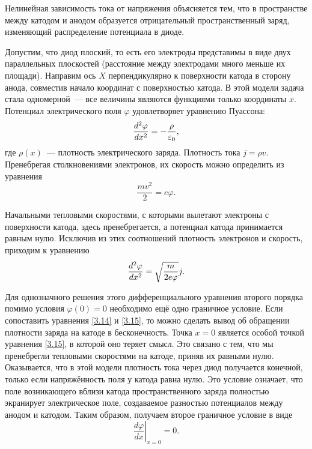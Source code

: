 Нелинейная зависимость тока от напряжения объясняется тем, что в пространстве между катодом и анодом образуется
отрицательный пространственный заряд, изменяющий распределение потенциала в диоде.

Допустим, что диод плоский, то есть его электроды представимы в виде двух параллельных плоскостей (расстояние между
электродами много меньше их площади). Направим ось $X$ перпендикулярно к поверхности катода в сторону анода, совместив начало координат с поверхностью катода. В этой модели задача стала одномерной~--- все величины являются функциями только координаты $x$. Потенциал электрического поля $\varphi$ удовлетворяет уравнению Пуассона:
\begin{equation}
	\eqmark{3.14}
	\frac{d^2\varphi}{dx^2}=-\frac{\rho}{\varepsilon_0},
\end{equation}
где $\rho(x)$~--- плотность электрического заряда. Плотность тока $j=\rho v$. Пренебрегая столкновениями электронов, их скорость можно определить из уравнения
\begin{equation*}
	\frac{mv^2}{2}=e\varphi.
\end{equation*}

Начальными тепловыми скоростями, с которыми вылетают электроны с поверхности катода, здесь пренебрегается, а потенциал катода принимается равным нулю. Исключив из этих соотношений плотность электронов и скорость, приходим к уравнению
\begin{equation}
	\eqmark{3.15}
	\frac{d^2\varphi}{dx^2}=\sqrt{\frac{m}{2e\varphi}} j.
\end{equation}

Для однозначного решения этого дифференциального уравнения второго порядка помимо условия $\varphi(0)=0$ необходимо ещё одно граничное условие. Если сопоставить уравнения \eqref{3.14} и \eqref{3.15}, то можно сделать вывод об обращении плотности заряда на катоде в бесконечность. Точка $x=0$ является особой точкой уравнения \eqref{3.15}, в которой оно теряет смысл. Это связано с тем, что мы пренебрегли тепловыми скоростями на катоде, приняв их равными нулю. Оказывается, что в этой модели плотность тока через диод получается конечной, только если напряжённость поля у катода равна нулю. Это условие означает, что поле возникающего вблизи катода пространственного заряда полностью экранирует электрическое поле, создаваемое разностью потенциалов между анодом и катодом. Таким образом, получаем второе граничное условие в виде
\begin{equation*}
	\left.\frac{d\varphi}{dx}\right|_{x = 0}=0.
\end{equation*}

